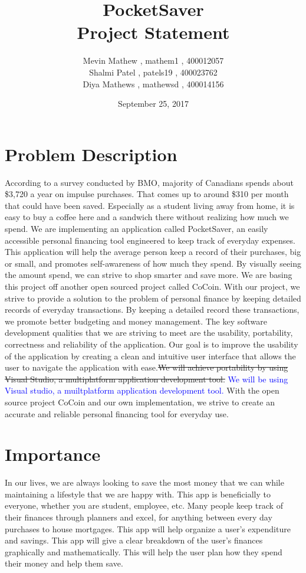 \documentclass[12pt]{article}
\title{PocketSaver \\ Project Statement}
\author{Mevin Mathew , mathem1 , 400012057 \\ Shalmi Patel , patels19 , 400023762 \\ Diya Mathews , mathewsd , 400014156}
\date{September 25, 2017}
\begin{document}
\maketitle
\newpage
\tableofcontents

\newpage

\section{Problem Description}
According to a survey conducted by BMO, majority of Canadians spends about \$3,720 a year on impulse purchases. That comes up to around \$310 per month that could have been saved. Especially as a student living away from home, it is easy to buy a coffee here and a sandwich there without realizing how much we spend. We are implementing an application called PocketSaver, an easily accessible personal financing tool engineered to keep track of everyday expenses. This application will help the average person keep a record of their purchases, big or small, and promotes self-awareness of how much they spend. By visually seeing the amount spend, we can strive to shop smarter and save more. We are basing this project off another open sourced project called CoCoin. With our project, we strive to provide a solution to the problem of personal finance by keeping detailed records of everyday transactions. By keeping a detailed record these transactions, we promote better budgeting and money management. The key software development qualities that we are striving to meet are the usability, portability, correctness and reliability of the application. Our goal is to improve the usability of the application by creating a clean and intuitive user interface that allows the user to navigate the application with ease.\st {We will achieve portability by using Visual Studio, a multiplatform application development tool.} \textcolor{blue}{We will be using Visual studio, a muiltplatform application development tool.} With the open source project CoCoin and our own implementation, we strive to create an accurate and reliable personal financing tool for everyday use.

\section{Importance}
In our lives, we are always looking to save the most money that we can while maintaining a lifestyle that we are happy with. This app is beneficially to everyone, whether you are student, employee, etc. Many people keep track of their finances through planners and excel, for anything between every day purchases to house mortgages. This app will help organize a user’s expenditure and savings. This app will give a clear breakdown of the user’s finances graphically and mathematically. This will help the user plan how they spend their money and help them save. 
\end{document}
